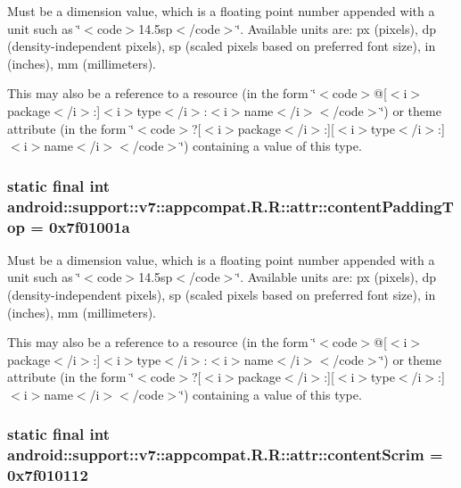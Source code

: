 Must be a dimension value, which is a floating point number appended with a unit such as \char`\"{}$<$code$>$14.5sp$<$/code$>$\char`\"{}. Available units are: px (pixels), dp (density-independent pixels), sp (scaled pixels based on preferred font size), in (inches), mm (millimeters). 

This may also be a reference to a resource (in the form \char`\"{}$<$code$>$@\mbox{[}$<$i$>$package$<$/i$>$:\mbox{]}$<$i$>$type$<$/i$>$:$<$i$>$name$<$/i$>$$<$/code$>$\char`\"{}) or theme attribute (in the form \char`\"{}$<$code$>$?\mbox{[}$<$i$>$package$<$/i$>$:\mbox{]}\mbox{[}$<$i$>$type$<$/i$>$:\mbox{]}$<$i$>$name$<$/i$>$$<$/code$>$\char`\"{}) containing a value of this type. \hypertarget{classandroid_1_1support_1_1v7_1_1appcompat_1_1_r_1_1attr_7214d5fe17b36a765c3a6563280543a5}{
\subsubsection[{contentPaddingTop}]{\setlength{\rightskip}{0pt plus 5cm}static final int android::support::v7::appcompat.R.R::attr::contentPaddingTop = 0x7f01001a}}
\label{classandroid_1_1support_1_1v7_1_1appcompat_1_1_r_1_1attr_7214d5fe17b36a765c3a6563280543a5}


Must be a dimension value, which is a floating point number appended with a unit such as \char`\"{}$<$code$>$14.5sp$<$/code$>$\char`\"{}. Available units are: px (pixels), dp (density-independent pixels), sp (scaled pixels based on preferred font size), in (inches), mm (millimeters). 

This may also be a reference to a resource (in the form \char`\"{}$<$code$>$@\mbox{[}$<$i$>$package$<$/i$>$:\mbox{]}$<$i$>$type$<$/i$>$:$<$i$>$name$<$/i$>$$<$/code$>$\char`\"{}) or theme attribute (in the form \char`\"{}$<$code$>$?\mbox{[}$<$i$>$package$<$/i$>$:\mbox{]}\mbox{[}$<$i$>$type$<$/i$>$:\mbox{]}$<$i$>$name$<$/i$>$$<$/code$>$\char`\"{}) containing a value of this type. \hypertarget{classandroid_1_1support_1_1v7_1_1appcompat_1_1_r_1_1attr_ebc1742ca061930cdeb0635234e0321a}{
\subsubsection[{contentScrim}]{\setlength{\rightskip}{0pt plus 5cm}static final int android::support::v7::appcompat.R.R::attr::contentScrim = 0x7f010112}}
\label{classandroid_1_1support_1_1v7_1_1appcompat_1_1_r_1_1attr_ebc1742ca061930cdeb0635234e0321a}


